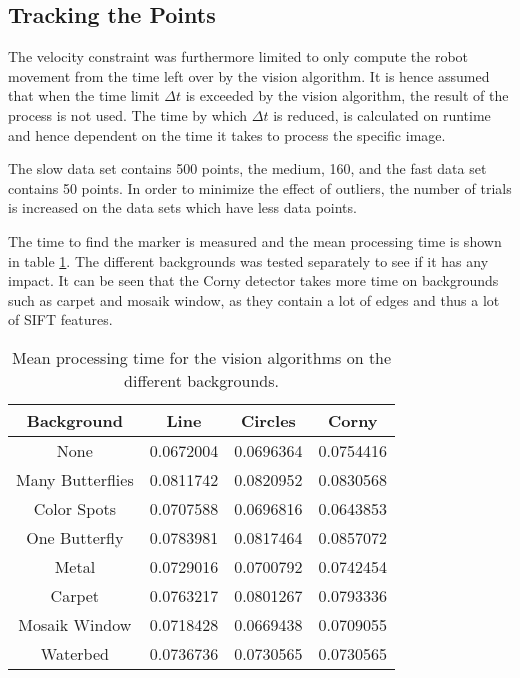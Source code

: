 \subsection{Tracking the Points}
The velocity constraint was furthermore limited to only compute the robot movement from the time left over by the vision algorithm.
It is hence assumed that when the time limit $\Delta t$ is exceeded by the vision algorithm, the result of the process is not used.
The time by which $\Delta t$ is reduced, is calculated on runtime and hence dependent on the time it takes to process the specific image.

The slow data set contains 500 points, the medium, 160, and the fast data set contains 50 points.
In order to minimize the effect of outliers, the number of trials is increased on the data sets which have less data points.

The time to find the marker is measured and the mean processing time is shown in table \ref{tb:mean_processing_time}.
The different backgrounds was tested separately to see if it has any impact.
It can be seen that the Corny detector takes more time on backgrounds such as carpet and mosaik window, as they contain a lot of edges and thus a lot of SIFT features.

\begin{table}[H]
\center
\begin{tabular}{|c|c|c|c|}
\hline
Background       & Line      & Circles   & Corny     \\ \hline
None             & 0.0672004 & 0.0696364 & 0.0754416 \\ \hline
Many Butterflies & 0.0811742 & 0.0820952 & 0.0830568 \\ \hline
Color Spots      & 0.0707588 & 0.0696816 & 0.0643853 \\ \hline
One Butterfly    & 0.0783981 & 0.0817464 & 0.0857072 \\ \hline
Metal            & 0.0729016 & 0.0700792 & 0.0742454 \\ \hline
Carpet           & 0.0763217 & 0.0801267 & 0.0793336 \\ \hline
Mosaik Window    & 0.0718428 & 0.0669438 & 0.0709055 \\ \hline
Waterbed         & 0.0736736 & 0.0730565 & 0.0730565 \\ \hline
\end{tabular}
\caption{Mean processing time for the vision algorithms on the different backgrounds.}
\label{tb:mean_processing_time}
\end{table}

